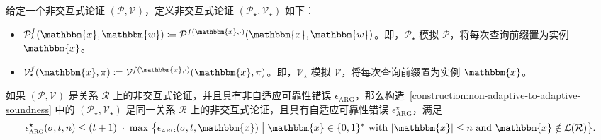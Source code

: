 \documentclass[american,singlepageview]{snargs-book-zh}
\newcommand{\Bits}{\{0,1\}}
\newcommand{\DefineEqual}{\coloneqq}
\newcommand{\SomeSize}[1]{|#1|}
\newcommand{\Relation}{\mathcal{R}}
\newcommand{\Language}{\mathcal{L}}
\newcommand{\GetLanguage}[1]{\Language(#1)}
\newcommand{\Instance}{\mathbbm{x}}
\newcommand{\Witness}{\mathbbm{w}}
\newcommand{\InstanceSize}{n}
\newcommand{\ProtoProver}{P}
\newcommand{\ProtoVerifier}{V}
\newcommand{\ProtoSoundnessError}{\epsilon}
\newcommand{\ARGSubscript}{\scriptscriptstyle\mathrm{ARG}}
\newcommand{\ARGFormat}[1]{\mathcal{#1}}
\newcommand{\ARGProver}{\ARGFormat{\ProtoProver}}
\newcommand{\ARGVerifier}{\ARGFormat{\ProtoVerifier}}
\newcommand{\ARGString}{\pi}
\newcommand{\ARGNASoundnessError}{\ProtoSoundnessError_{\ARGSubscript}}
\newcommand{\ARGSoundnessError}{\ProtoSoundnessError_{\ARGSubscript}}
\newcommand{\ROFunction}{f}
\newcommand{\ROQueryBound}{t}
\newcommand{\ROOutputSize}{\sigma}
\newcommand{\MaxSoundness}[1]{\max\, \big\{ #1 \;\big\vert\;\Instance \in \Bits^{*} \text{ with } \SomeSize{\Instance} \leq \InstanceSize \text{ and } \Instance \notin \GetLanguage{\Relation} \big\}}
\begin{document}
\begin{construction}
\label{construction:non-adaptive-to-adaptive-soundness}
给定一个非交互式论证 $(\ARGProver,\ARGVerifier)$，定义非交互式论证 $(\ARGProver_{\star},\ARGVerifier_{\star})$ 如下：
\begin{itemize}
  \item $\ARGProver_{\star}^{\ROFunction}(\Instance,\Witness) \DefineEqual \ARGProver^{\ROFunction(\Instance,\cdot)}(\Instance,\Witness)$。即，$\ARGProver_{\star}$ 模拟 $\ARGProver$，将每次查询前缀置为实例 $\Instance$。
  \item $\ARGVerifier_{\star}^{\ROFunction}(\Instance,\ARGString) \DefineEqual \ARGVerifier^{\ROFunction(\Instance,\cdot)}(\Instance,\ARGString)$。即，$\ARGVerifier_{\star}$ 模拟 $\ARGVerifier$，将每次查询前缀置为实例 $\Instance$。
\end{itemize}
\end{construction}

\begin{lemma}
\label{lemma:non-adaptive-to-adaptive-soundness}
如果 $(\ARGProver,\ARGVerifier)$ 是关系 $\Relation$ 上的非交互式论证，并且具有非自适应可靠性错误 $\ARGNASoundnessError$，那么构造~\ref{construction:non-adaptive-to-adaptive-soundness} 中的 $(\ARGProver_{\star},\ARGVerifier_{\star})$ 是同一关系 $\Relation$ 上的非交互式论证，且具有自适应可靠性错误 $\ARGSoundnessError^{\star}$，满足
\[
\ARGSoundnessError^{\star}(\ROOutputSize,\ROQueryBound,\InstanceSize)
\le
(\ROQueryBound+1)\;\cdot\;
\MaxSoundness{\ARGNASoundnessError(\ROOutputSize,\ROQueryBound,\Instance)}.
\]
\end{lemma}
\end{document}
